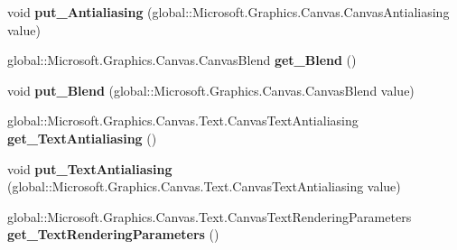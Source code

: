 \begin{DoxyCompactItemize}
\mbox{\label{class_microsoft_1_1_graphics_1_1_canvas_1_1_canvas_drawing_session_a643deac9ab9103ed88e1228b0604aa37}} 
void {\bfseries put\+\_\+\+Antialiasing} (global\+::\+Microsoft.\+Graphics.\+Canvas.\+Canvas\+Antialiasing value)
\item 
\mbox{\label{class_microsoft_1_1_graphics_1_1_canvas_1_1_canvas_drawing_session_af6c74d142fed43142881bd3d9d4d837a}} 
global\+::\+Microsoft.\+Graphics.\+Canvas.\+Canvas\+Blend {\bfseries get\+\_\+\+Blend} ()
\item 
\mbox{\label{class_microsoft_1_1_graphics_1_1_canvas_1_1_canvas_drawing_session_aa6c91c25f9b08acbdea5066bb53e564e}} 
void {\bfseries put\+\_\+\+Blend} (global\+::\+Microsoft.\+Graphics.\+Canvas.\+Canvas\+Blend value)
\item 
\mbox{\label{class_microsoft_1_1_graphics_1_1_canvas_1_1_canvas_drawing_session_a10f396358c7e8a2bacb1fee9dd5d4e7d}} 
global\+::\+Microsoft.\+Graphics.\+Canvas.\+Text.\+Canvas\+Text\+Antialiasing {\bfseries get\+\_\+\+Text\+Antialiasing} ()
\item 
\mbox{\label{class_microsoft_1_1_graphics_1_1_canvas_1_1_canvas_drawing_session_a66f5415d3bdfca1acb7959637e990933}} 
void {\bfseries put\+\_\+\+Text\+Antialiasing} (global\+::\+Microsoft.\+Graphics.\+Canvas.\+Text.\+Canvas\+Text\+Antialiasing value)
\item 
\mbox{\label{class_microsoft_1_1_graphics_1_1_canvas_1_1_canvas_drawing_session_abb03351b4efecdbde83c55547f05de3e}} 
global\+::\+Microsoft.\+Graphics.\+Canvas.\+Text.\+Canvas\+Text\+Rendering\+Parameters {\bfseries get\+\_\+\+Text\+Rendering\+Parameters} ()
\item 
\mbox{\label{class_microsoft_1_1_graphics_1_1_canvas_1_1_canvas_drawing_session_aa349f61b04c1a61331c6c070f7040576}} 

\end{DoxyCompactItemize}
